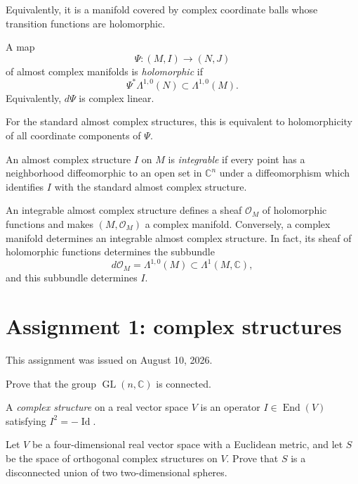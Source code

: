 Equivalently, it is a manifold covered by
complex coordinate balls whose transition
functions are holomorphic.

\begin{definition}
\label{definition-holomorphic-ac-map}
A map
$$
\Psi:(M,I)\longrightarrow(N,J)
$$
of almost complex manifolds is
{\it holomorphic} if
$$
\Psi^*\Lambda^{1,0}(N)
\subset\Lambda^{1,0}(M).
$$
Equivalently, $d\Psi$ is complex linear.
\end{definition}

For the standard almost complex structures,
this is equivalent to holomorphicity of all
coordinate components of $\Psi$.

\begin{definition}
\label{definition-integrable-ac}
An almost complex structure $I$ on $M$ is
{\it integrable} if every point has a
neighborhood diffeomorphic to an open set
in $\mathbb{C}^n$ under a diffeomorphism
which identifies $I$ with the standard
almost complex structure.
\end{definition}

An integrable almost complex structure
defines a sheaf $\mathcal{O}_M$ of
holomorphic functions and makes
$(M,\mathcal{O}_M)$ a complex manifold.
Conversely, a complex manifold determines
an integrable almost complex structure. In
fact, its sheaf of holomorphic functions
determines the subbundle
$$
d\mathcal{O}_M
=\Lambda^{1,0}(M)
\subset\Lambda^1(M,\mathbb{C}),
$$
and this subbundle determines $I$.

\section{Assignment 1: complex structures}
\label{section-assignment-one-complex}

\noindent
This assignment was issued on August 10,
2026.

\begin{exercise}
\label{exercise-assignment-one-gl}
Prove that the group
$\operatorname{GL}(n,\mathbb{C})$ is
connected.
\end{exercise}

\begin{definition}
\label{definition-assignment-complex}
A {\it complex structure} on a real vector
space $V$ is an operator
$I\in\operatorname{End}(V)$ satisfying
$I^2=-\operatorname{Id}$.
\end{definition}

\begin{exercise}
\label{exercise-orthogonal-complex-four}
Let $V$ be a four-dimensional real vector
space with a Euclidean metric, and let $S$
be the space of orthogonal complex
structures on $V$. Prove that $S$ is a
disconnected union of two two-dimensional
spheres.
\end{exercise}

